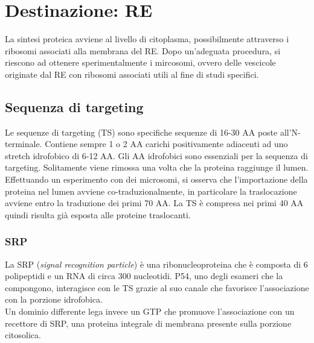 \section{Destinazione: RE}
    La sintesi proteica avviene al livello di citoplasma, possibilmente attraverso i ribosomi associati alla membrana del RE. 
    Dopo un'adeguata procedura, si riescono ad ottenere sperimentalmente i mircosomi, ovvero delle vescicole originate dal RE con ribosomi associati utili al fine di studi specifici.
    
    \subsection{Sequenza di targeting}
            Le sequenze di targeting (TS) sono specifiche sequenze di 16-30 AA poste all'N-terminale. Contiene sempre 1 o 2 AA carichi positivamente adiacenti ad uno stretch idrofobico di 6-12 AA. Gli AA idrofobici sono essenziali per la sequenza di targeting.
            Solitamente viene rimossa una volta che la proteina raggiunge il lumen. \\
            Effettuando un esperimento con dei microsomi, si osserva che l'importazione della proteina nel lumen avviene co-traduzionalmente, in particolare la traslocazione avviene entro la traduzione dei primi 70 AA. La TS è compresa nei primi 40 AA quindi risulta già esposta alle proteine traslocanti.\\
            
            \subsubsection{SRP}
                La SRP (\textit{signal recognition particle}) è una ribonucleoproteina che è composta di 6 polipeptidi e un RNA di circa 300 nucleotidi. P54, uno degli esameri che la compongono, interagisce con le TS grazie al suo canale che favorisce l'associazione con la porzione idrofobica.\\
                Un dominio differente lega invece un GTP che promuove l'associazione con un recettore di SRP, una proteina integrale di membrana presente sulla porzione citosolica.
            
